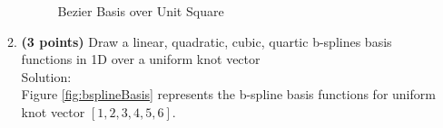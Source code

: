 \documentclass[a4paper, 11pt]{article}
\begin{document}
\begin{enumerate}
\begin{enumerate}[label=\alph*.]
\begin{figure}[ht]
{  } 
  \caption{Bezier Basis over Unit Square} 
  \label{fig:bezierBasisSurface}
\end{figure}
    \item \textbf{(3 points)} Draw a linear, quadratic, cubic, quartic b-splines basis functions in 1D over a uniform knot vector \\
    Solution: \\
    Figure \ref{fig:bsplineBasis} represents the b-spline basis functions for uniform knot vector \([1,2,3,4,5,6]\).
    \begin{figure}[ht] 
 \quad 
\end{figure}
\end{enumerate}
\end{enumerate}
\end{document}
